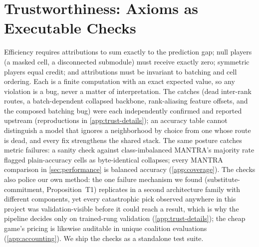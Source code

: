 \section{Trustworthiness: Axioms as Executable Checks}
\label{sec:trustworthiness}

 Efficiency
requires attributions to sum exactly to the prediction gap; null
players (a masked cell, a disconnected submodule) must receive exactly
zero; symmetric players equal credit; and attributions must be
invariant to batching and cell ordering. Each is a finite computation
with an exact expected value, so any violation is a bug, never a
matter of interpretation. The catches (dead inter-rank routes,
a batch-dependent collapsed backbone, rank-aliasing feature offsets,
and the composed batching bug) were each independently confirmed and
reported upstream (reproductions in \cref{app:trust-details}); an
accuracy table cannot distinguish a model that ignores a neighborhood
by choice from one whose route is dead, and every fix strengthens the
shared stack. The same posture catches metric failures: a sanity
check against class-imbalanced MANTRA's majority rate flagged
\unfrozen{\ResMantraCollapsedModels} plain-accuracy cells as
byte-identical collapses; every MANTRA comparison in
\cref{sec:performance} is balanced accuracy (\cref{app:coverage}).
The checks also police our own method: the one failure
mechanism we found (substitute-commitment, Proposition~T1) replicates
in a second architecture family with different components, yet every
catastrophic pick observed anywhere in this project was
validation-visible before it could reach a result, which is why the
pipeline decides only on trained-rung validation
(\cref{app:trust-details}); the cheap game's pricing is likewise
auditable in unique coalition evaluations (\cref{app:accounting}). We
ship the checks as a standalone test suite.



